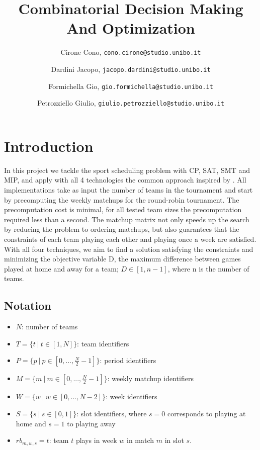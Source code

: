 \documentclass{article}
\title{Combinatorial Decision Making And Optimization}
\author{
  Cirone Cono, \texttt{cono.cirone@studio.unibo.it}
  \and
  Dardini Jacopo, \texttt{jacopo.dardini@studio.unibo.it}
  \and
  Formichella Gio, \texttt{gio.formichella@studio.unibo.it}
  \and
  Petrozziello Giulio, \texttt{giulio.petrozziello@studio.unibo.it} 
}
\date{}
\begin{document}
\maketitle


\section{Introduction}
In this project we tackle the sport scheduling problem with CP, SAT, SMT and MIP, and apply with all 4 technologies the common approach inspired by \cite{10.1007/10704567_6}. All implementations take as input the number of teams in the tournament and start by precomputing the weekly matchups for the round-robin tournament. The precomputation cost is minimal, for all tested team sizes the precomputation required less than a second. The matchup matrix not only speeds up the search by reducing the problem to ordering matchups, but also guarantees that the constraints of each team playing each other and playing once a week are satisfied. With all four techniques, we aim to find a solution satisfying the constraints and minimizing the objective variable D, the maximum difference between games played at home and away for a team; $D\in [1, n-1]$, where n is the number of teams.

\subsection{Notation}
\begin{itemize}
  \item $N$: number of teams
  \item $T=\{t\ |\ t \in [1, N]\}$: team identifiers
  \item $P=\{p\ |\ p \in [0, ..., \frac{N}{2} - 1]\}$: period identifiers
  \item $M=\{m\ |\ m \in [0, ..., \frac{N}{2} - 1]\}$: weekly matchup identifiers
  \item $W=\{w\ |\ w \in [0, ..., N-2]\}$: week identifiers
  \item $S=\{s\ |\ s \in [0,1]\}$: slot identifiers, where $s=0$ corresponds to playing at home and $s=1$ to playing away
  \item $rb_{m, w, s}=t$: team $t$ plays in week $w$ in match $m$ in slot $s$.
  
\end{itemize}











\end{document}
